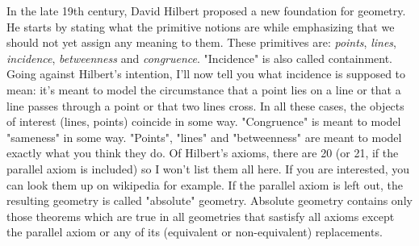\medskip
In the late 19th century, David Hilbert proposed a new foundation for geometry. He starts by stating what the primitive notions are while emphasizing that we should not yet assign any meaning to them. These primitives are: \emph{points}, \emph{lines}, \emph{incidence}, \emph{betweenness} and \emph{congruence}. "Incidence" is also called containment. Going against Hilbert's intention, I'll now tell you what incidence is supposed to mean: it's meant to model the circumstance that a point lies on a line or that a line passes through a point or that two lines cross. In all these cases, the objects of interest (lines, points) coincide in some way. "Congruence" is meant to model "sameness" in some way. "Points", "lines" and "betweenness" are meant to model exactly what you think they do. Of Hilbert's axioms, there are 20 (or 21, if the parallel axiom is included) so I won't list them all here. If you are interested, you can look them up on wikipedia for example. If the parallel axiom is left out, the resulting geometry is called "absolute" geometry. Absolute geometry contains only those theorems which are true in all geometries that sastisfy all axioms except the parallel axiom or any of its (equivalent or non-equivalent) replacements.

